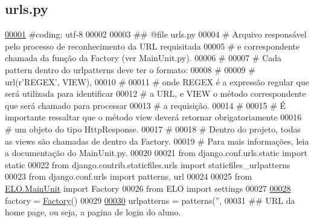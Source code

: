 \hypertarget{urls_8py_source}{}\subsection{urls.\+py}
\label{urls_8py_source}

\begin{DoxyCode}
\hypertarget{urls_8py_source_l00001}{}\hyperlink{namespaceELO_1_1urls}{00001} \textcolor{comment}{#coding: utf-8}
00002 
00003 \textcolor{comment}{## @file urls.py}
00004 \textcolor{comment}{#   Arquivo responsável pelo processo de reconhecimento da URL requisitada}
00005 \textcolor{comment}{#   e correspondente chamada da função da Factory (ver MainUnit.py).}
00006 \textcolor{comment}{#}
00007 \textcolor{comment}{#   Cada pattern dentro do urlpatterns deve ter o formato:}
00008 \textcolor{comment}{#}
00009 \textcolor{comment}{#       url(r'REGEX', VIEW),}
00010 \textcolor{comment}{#}
00011 \textcolor{comment}{#   onde REGEX é a expressão regular que será utilizada para identificar}
00012 \textcolor{comment}{#   a URL, e VIEW o método correspondente que será chamado para processar}
00013 \textcolor{comment}{#   a requisição.}
00014 \textcolor{comment}{#}
00015 \textcolor{comment}{#   É importante ressaltar que o método view deverá retornar obrigatoriamente}
00016 \textcolor{comment}{#   um objeto do tipo HttpResponse.}
00017 \textcolor{comment}{#}
00018 \textcolor{comment}{#   Dentro do projeto, todas as views são chamadas de dentro da Factory.}
00019 \textcolor{comment}{#   Para mais informações, leia a documentação do MainUnit.py.}
00020 
00021 \textcolor{keyword}{from} django.conf.urls.static \textcolor{keyword}{import} static
00022 \textcolor{keyword}{from} django.contrib.staticfiles.urls \textcolor{keyword}{import} staticfiles\_urlpatterns
00023 \textcolor{keyword}{from} django.conf.urls \textcolor{keyword}{import} patterns, url
00024 
00025 \textcolor{keyword}{from} \hyperlink{namespaceELO_1_1MainUnit}{ELO.MainUnit} \textcolor{keyword}{import} Factory
00026 \textcolor{keyword}{from} ELO \textcolor{keyword}{import} settings
00027 
\hypertarget{urls_8py_source_l00028}{}\hyperlink{namespaceELO_1_1urls_a85325dfebd736ced5558533f2c4bc29a}{00028} factory = \hyperlink{classELO_1_1MainUnit_1_1Factory}{Factory}()
00029 
\hypertarget{urls_8py_source_l00030}{}\hyperlink{namespaceELO_1_1urls_a3451f093ed6ab05c006fd0d1cdba836d}{00030} urlpatterns = patterns(\textcolor{stringliteral}{''}, 
00031     \textcolor{comment}{## URL da home page, ou seja, a pagina de login do aluno.}

\end{DoxyCode}
